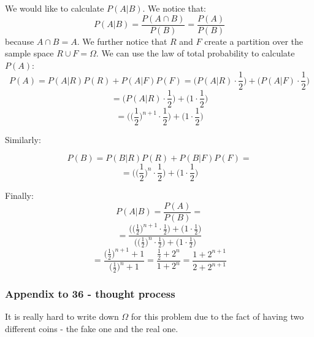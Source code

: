 \documentclass{article}
\begin{document}
We would like to calculate \(P(A | B)\). We notice that:
\begin{equation*}
    P(A|B) = \frac{P(A \cap B)}{P(B)} = \frac{P(A)}{P(B)}
\end{equation*}
because \(A \cap B = A\). We further notice that \(R\) and \(F\) create a partition over the sample space \(R \cup F = \Omega\).
We can use the law of total probability to calculate \(P(A)\):
\begin{equation*}
    P(A) = P(A|R)P(R) + P(A|F)P(F) = \Bigg(P(A|R) \cdot \frac{1}{2}\Bigg) + \Bigg(P(A|F) \cdot \frac{1}{2}\Bigg)
\end{equation*}
\begin{equation*}
    = \Bigg(P(A|R) \cdot \frac{1}{2}\Bigg) + \Bigg(1 \cdot \frac{1}{2}\Bigg)
\end{equation*}
\begin{equation*}
    = \Bigg( \Big(\frac{1}{2}\Big)^{n+1} \cdot \frac{1}{2}\Bigg) + \Bigg(1 \cdot \frac{1}{2}\Bigg)
\end{equation*}


Similarly:

\begin{equation*}
    P(B) = P(B|R)P(R) + P(B|F)P(F) = 
\end{equation*}
\begin{equation*}
    = \Bigg(\Big(\frac{1}{2}\Big)^{n} \cdot \frac{1}{2}\Bigg) + \Bigg(1 \cdot \frac{1}{2}\Bigg)
\end{equation*}

Finally:
\begin{equation*}
    P(A|B) = \frac{P(A)}{P(B)} =
\end{equation*}
\begin{equation*}
    = \frac{\Bigg( \Big(\frac{1}{2}\Big)^{n+1} \cdot \frac{1}{2}\Bigg) + \Bigg(1 \cdot \frac{1}{2}\Bigg)}{\Bigg(\Big(\frac{1}{2}\Big)^{n} \cdot \frac{1}{2}\Bigg) + \Bigg(1 \cdot \frac{1}{2}\Bigg)}
\end{equation*}
\begin{equation*}
    = \frac{ \Big(\frac{1}{2}\Big)^{n+1} + 1}{\Big(\frac{1}{2}\Big)^{n} + 1} = \frac{\frac{1}{2} + 2^{n}}{1 + 2^{n}} = \frac{1 + 2^{n+1}}{2 + 2^{n+1}}
\end{equation*}

\subsubsection*{Appendix to 36 - thought process}
It is really hard to write down \(\Omega\) for this problem due to the fact of having two different
coins - the fake one and the real one.
\end{document}
